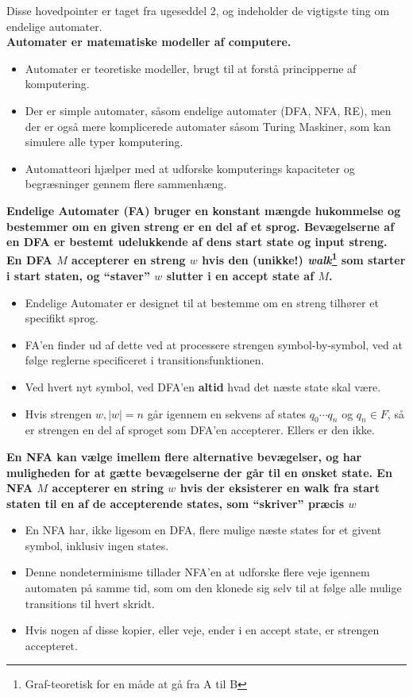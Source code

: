 Disse hovedpointer er taget fra ugeseddel 2, og indeholder de vigtigste ting om endelige automater.\\
\noindent
\textbf{Automater er matematiske modeller af computere.}
\begin{itemize}
  \item Automater er teoretiske modeller, brugt til at forstå principperne af komputering.
  \item Der er simple automater, såsom endelige automater (DFA, NFA, RE), men der er også mere komplicerede automater såsom Turing Maskiner, som kan simulere alle typer komputering.
  \item Automatteori hjælper med at udforske komputerings kapaciteter og begræsninger gennem flere sammenhæng.
\end{itemize}
\noindent
\textbf{Endelige Automater (FA) bruger en konstant mængde hukommelse og bestemmer om en given streng er en del af et sprog. Bevægelserne af en DFA er bestemt udelukkende af dens start state og input streng. En DFA $M$ accepterer en streng $w$ hvis den (unikke!) \textit{walk}\footnote{Graf-teoretisk for en måde at gå fra A til B} som starter i start staten, og ``staver'' $w$ slutter i en accept state af $M$.}
\begin{itemize}
  \item Endelige Automater er designet til at bestemme om en streng tilhører et specifikt sprog.
  \item FA'en finder ud af dette ved at processere strengen symbol-by-symbol, ved at følge reglerne specificeret i transitionsfunktionen.
  \item Ved hvert nyt symbol, ved DFA'en \textbf{altid} hvad det næste state skal være.
  \item Hvis strengen $w, |w| = n$ går igennem en sekvens af states $q_{0} \cdots q_{n}$ og $q_{n} \in F$, så er strengen en del af sproget som DFA'en accepterer. Ellers er den ikke.
\end{itemize}
\noindent
\textbf{En NFA kan vælge imellem flere alternative bevægelser, og har muligheden for at gætte bevægelserne der går til en ønsket state. En NFA $M$ accepterer en string $w$ hvis der eksisterer en walk fra start staten til en af de accepterende states, som ``skriver'' præcis $w$}
\begin{itemize}
  \item En NFA har, ikke ligesom en DFA, flere mulige næste states for et givent symbol, inklusiv ingen states.
  \item Denne nondeterminisme tillader NFA'en at udforske flere veje igennem automaten på samme tid, som om den klonede sig selv til at følge alle mulige transitions til hvert skridt.
  \item Hvis nogen af disse kopier, eller veje, ender i en accept state, er strengen accepteret.
\end{itemize}
